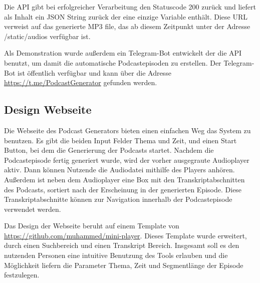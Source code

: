Die API gibt bei erfolgreicher Verarbeitung den Statuscode 200 zurück und liefert als Inhalt ein JSON String zurück der eine einzige Variable  enthält.
Diese URL verweist auf das generierte MP3 file, das ab diesem Zeitpunkt unter der Adresse /static/audios verfügbar ist.

Als Demonstration wurde außerdem ein Telegram-Bot entwickelt der die API benutzt, um damit die automatische Podcastepisoden zu erstellen.
Der Telegram-Bot ist öffentlich verfügbar und kann über die Adresse \url{https://t.me/PodcastGenerator} gefunden werden.

\subsection{Design Webseite}

Die Webseite des Podcast Generators bieten einen einfachen Weg das System zu benutzen.
Es gibt die beiden Input Felder Thema und Zeit, und einen Start Button, bei dem die Generierung der Podcasts startet.
Nachdem die Podcastepisode fertig generiert wurde, wird der vorher ausgegraute Audioplayer aktiv.
Dann können Nutzende die Audiodatei mithilfe des Players anhören.
Außerdem ist neben dem Audioplayer eine Box mit den Transkriptabschnitten des Podcasts, sortiert nach der Erscheinung in der generierten Episode.
Diese Transkriptabschnitte können zur Navigation innerhalb der Podcastepisode verwendet werden.


Das Design der Webseite beruht auf einem Template von \url{https://github.com/muhammed/mini-player}.
Dieses Template wurde erweitert, durch einen Suchbereich und einen Transkript Bereich.
Insgesamt soll es den nutzenden Personen eine intuitive Benutzung des Tools erlauben und die Möglichkeit liefern die Parameter Thema, Zeit und Segmentlänge der Episode festzulegen. 


